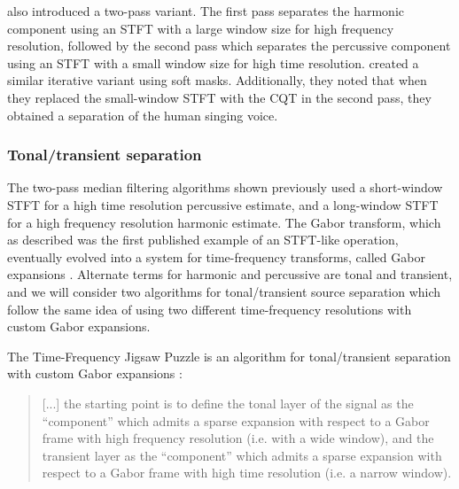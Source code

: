 \documentclass[report.tex]{subfiles}
\begin{document}
\textcite{driedger} also introduced a two-pass variant. The first pass separates the harmonic component using an STFT with a large window size for high frequency resolution, followed by the second pass which separates the percussive component using an STFT with a small window size for high time resolution. \textcite{fitzgerald2} created a similar iterative variant using soft masks. Additionally, they noted that when they replaced the small-window STFT with the CQT in the second pass, they obtained a separation of the human singing voice.

\subsubsection{Tonal/transient separation}
\label{sec:custgabor}

The two-pass median filtering algorithms shown previously used a short-window STFT for a high time resolution percussive estimate, and a long-window STFT for a high frequency resolution harmonic estimate. The Gabor transform, which as described was the first published example of an STFT-like operation, eventually evolved into a system for time-frequency transforms, called Gabor expansions \parencite{gaborexpansion}. Alternate terms for harmonic and percussive are tonal and transient, and we will consider two algorithms for tonal/transient source separation which follow the same idea of using two different time-frequency resolutions with custom Gabor expansions.

The Time-Frequency Jigsaw Puzzle is an algorithm for tonal/transient separation with custom Gabor expansions \parencite[6--7]{tfjigsaw}:
\begin{quote}
	[...] the starting point is to define the tonal layer of the signal as the ``component'' which admits a sparse expansion with respect to a Gabor frame with high frequency resolution (i.e. with a wide window), and the transient layer as the ``component'' which admits a sparse expansion with respect to a Gabor frame with high time resolution (i.e. a narrow window).
\end{quote}
\end{document}
